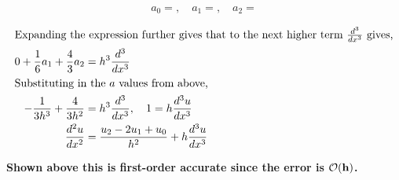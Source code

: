 \vspace{-0.5in}
\begin{equation*}
    \boxed{a_0 = ,\quad  a_1 = ,\quad  a_2 = }
\end{equation*}

\vspace{-0.35in}
\begin{align*}
    \shortintertext{Expanding the expression further gives that to the next higher term $\frac{d^3}{dx^3}$ gives,}
    0 + \frac{1}{6}a_1 + \frac{4}{3}a_2 & = h^3\frac{d^3}{dx^3}\\
    \shortintertext{Substituting in the $a$ values from above,}
    -\frac{1}{3h^3} + \frac{4}{3h^2} & = h^3\frac{d^3}{dx^3},\quad 1 = h\frac{d^3u}{dx^3}\\
    \frac{d^2u}{dx^2} & = \frac{u_2 -2u_1 + u_0}{h^2} + h\frac{d^3u}{dx^3}\\
\end{align*}

\vspace{-0.25in}
\begin{fminipage}{0.8\linewidth}
    \centering
    \textbf{Shown above this is first-order accurate since the error is $\bf \mathcal{O}(h)$.}
\end{fminipage}


